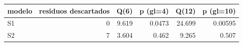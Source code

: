 \begin{tabular}{lrrrrr}
\toprule
modelo & residuos descartados & Q(6) & p (gl=4) & Q(12) & p (gl=10) \\
\midrule
S1 & 0 & 9.619 & 0.0473 & 24.699 & 0.00595 \\
S2 & 7 & 3.604 & 0.462 & 9.265 & 0.507 \\
\bottomrule
\end{tabular}